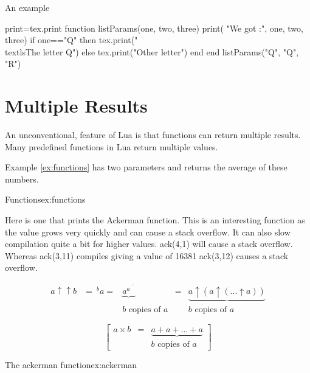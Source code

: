 \begin{texexample}{An example}{}
\begin{luacode}
print=tex.print
function listParams(one, two, three)
print( "We got :", one, two, three)
if one=="Q" then
  tex.print("\\textls{The letter Q}")
else
  tex.print("Other letter")
end
end
listParams("Q", "Q", "R")
\end{luacode}
\end{texexample}


\section{Multiple Results}

An unconventional, feature of Lua is that functions can return multiple results. Many predefined functions in Lua return multiple values. 

Example \ref{ex:functions} has two parameters and returns the average of these numbers.

\begin{texexample}{Functions}{ex:functions}
\end{texexample}

Here is one that prints the Ackerman function. This is an interesting function as the value grows very quickly and can cause a stack overflow. It can also slow compilation quite a bit for higher values. ack(4,1) will cause a stack overflow. Whereas ack(3,11) compiles giving a value of 16381 ack(3,12) causes a stack overflow.  

\[
\begin{matrix}
   a\uparrow\uparrow b & = {\ ^{b}a}  = & \underbrace{a^{a^{{}^{.\,^{.\,^{.\,^a}}}}}} & 
   = & \underbrace{a\uparrow (a\uparrow(\dots\uparrow a))} 
\\  
    & & b\mbox{ copies of }a
    & & b\mbox{ copies of }a
  \end{matrix}
\]

\[
\begin{bmatrix}
   a\times b & = & \underbrace{a+a+\dots+a} \\
   & & b\mbox{ copies of }a
\end{bmatrix} 
\]


\begin{texexample}{The ackerman function}{ex:ackerman}
\end{texexample}


